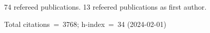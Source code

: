 74 refereed publications. 13 refeered publications as first author.

Total citations~=~3768; h-index~=~34 (2024-02-01)